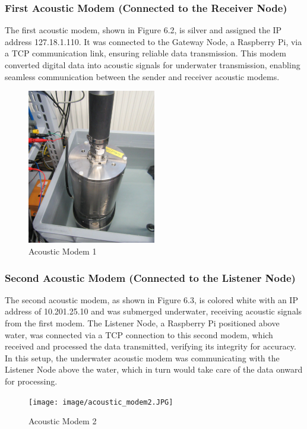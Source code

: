 \documentclass[]{nsm-thesis}
\begin{document}
\subsubsection{First Acoustic Modem (Connected to the Receiver Node)}
The first acoustic modem, shown in Figure 6.2, is silver and assigned the IP address 127.18.1.110. It was connected to the Gateway Node, a Raspberry Pi, via a TCP communication link, ensuring reliable data transmission. This modem converted digital data into acoustic signals for underwater transmission, enabling seamless communication between the sender and receiver acoustic modems.
\begin{figure}[h!]
    \centering
    \includegraphics[width=0.5\textwidth]{image/acoustic_modem1.JPG}
    \caption{Acoustic Modem 1}
    \label{fig:example1}
\end{figure}


\subsubsection{Second Acoustic Modem (Connected to the Listener Node)}
The second acoustic modem, as shown in Figure 6.3, is colored white with an IP address of 10.201.25.10 and was submerged underwater, receiving acoustic signals from the first modem. The Listener Node, a Raspberry Pi positioned above water, was connected via a TCP connection to this second modem, which received and processed the data transmitted, verifying its integrity for accuracy. In this setup, the underwater acoustic modem was communicating with the Listener Node above the water, which in turn would take care of the data onward for processing.
\begin{figure}[h!]
    \centering
    \texttt{[image: image/acoustic\_modem2.JPG]}
    \caption{Acoustic Modem 2}
    \label{fig:example2}
\end{figure}
\end{document}
